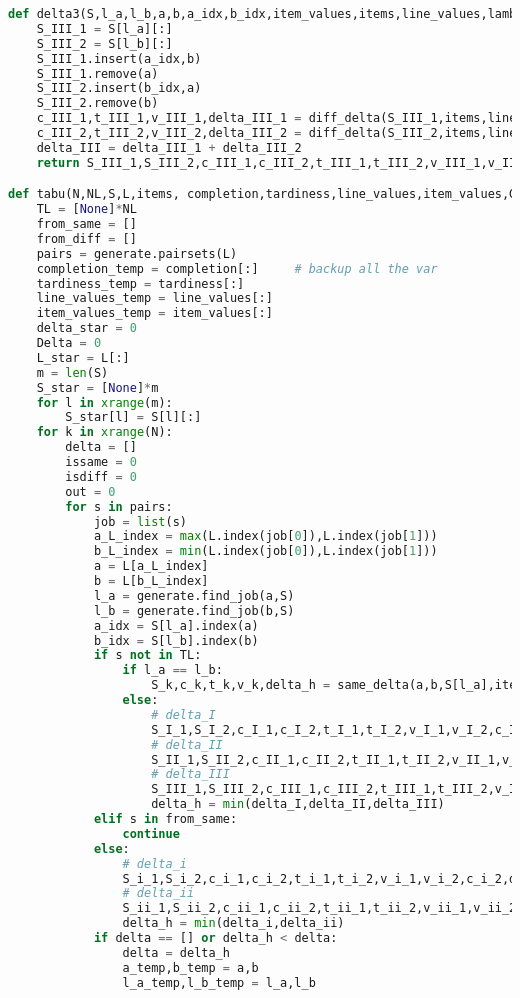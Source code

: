 \begin{lstlisting}[language = Python]
def delta3(S,l_a,l_b,a,b,a_idx,b_idx,item_values,items,line_values,lambda1,lambda2):	# insert item type 3
	S_III_1 = S[l_a][:]
	S_III_2 = S[l_b][:]
	S_III_1.insert(a_idx,b)
	S_III_1.remove(a)
	S_III_2.insert(b_idx,a)
	S_III_2.remove(b)
	c_III_1,t_III_1,v_III_1,delta_III_1 = diff_delta(S_III_1,items,line_values[l_a],lambda1,lambda2)
	c_III_2,t_III_2,v_III_2,delta_III_2 = diff_delta(S_III_2,items,line_values[l_b],lambda1,lambda2)
	delta_III = delta_III_1 + delta_III_2
	return S_III_1,S_III_2,c_III_1,c_III_2,t_III_1,t_III_2,v_III_1,v_III_2,delta_III

def tabu(N,NL,S,L,items, completion,tardiness,line_values,item_values,G,lambda1,lambda2):
	TL = [None]*NL
	from_same = []
	from_diff = []
	pairs = generate.pairsets(L)
	completion_temp = completion[:] 	# backup all the var
	tardiness_temp = tardiness[:]
	line_values_temp = line_values[:]
	item_values_temp = item_values[:]
	delta_star = 0
	Delta = 0
	L_star = L[:]
	m = len(S)
	S_star = [None]*m
	for l in xrange(m):
		S_star[l] = S[l][:]
	for k in xrange(N):
		delta = []
		issame = 0
		isdiff = 0
		out = 0
		for s in pairs:
			job = list(s)
			a_L_index = max(L.index(job[0]),L.index(job[1]))
			b_L_index = min(L.index(job[0]),L.index(job[1]))
			a = L[a_L_index]
			b = L[b_L_index]
			l_a = generate.find_job(a,S)
			l_b = generate.find_job(b,S)
			a_idx = S[l_a].index(a)
			b_idx = S[l_b].index(b)
			if s not in TL:
				if l_a == l_b:
					S_k,c_k,t_k,v_k,delta_h = same_delta(a,b,S[l_a],items,line_values_temp[l_a],lambda1,lambda2)
				else:
					# delta_I
					S_I_1,S_I_2,c_I_1,c_I_2,t_I_1,t_I_2,v_I_1,v_I_2,c_I_2,delta_I = delta1(S,l_a,l_b,a,b_idx,item_values,items,line_values_temp,lambda1,lambda2)
					# delta_II
					S_II_1,S_II_2,c_II_1,c_II_2,t_II_1,t_II_2,v_II_1,v_II_2,delta_II = delta2(S,l_a,l_b,b,a_idx,item_values,items,line_values_temp,lambda1,lambda2)
					# delta_III
					S_III_1,S_III_2,c_III_1,c_III_2,t_III_1,t_III_2,v_III_1,v_III_2,delta_III = delta3(S,l_a,l_b,a,b,a_idx,b_idx,item_values,items,line_values_temp,lambda1,lambda2)
					delta_h = min(delta_I,delta_II,delta_III)
			elif s in from_same:
				continue
			else:
				# delta_i
				S_i_1,S_i_2,c_i_1,c_i_2,t_i_1,t_i_2,v_i_1,v_i_2,c_i_2,delta_i = delta1(S,l_a,l_b,a,b_idx,item_values,items,line_values_temp,lambda1,lambda2)
				# delta_ii
				S_ii_1,S_ii_2,c_ii_1,c_ii_2,t_ii_1,t_ii_2,v_ii_1,v_ii_2,delta_ii = delta2(S,l_a,l_b,b,a_idx,item_values,items,line_values_temp,lambda1,lambda2)
				delta_h = min(delta_i,delta_ii)
			if delta == [] or delta_h < delta:
				delta = delta_h
				a_temp,b_temp = a,b
				l_a_temp,l_b_temp = l_a,l_b

\end{lstlisting}
